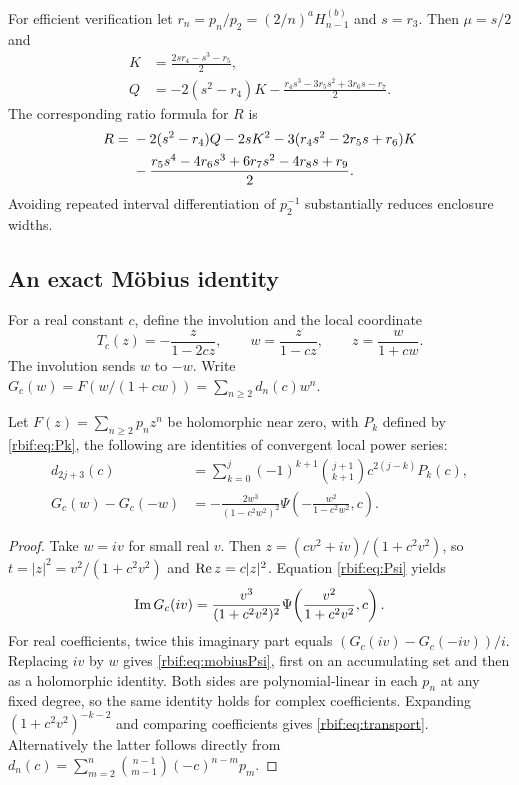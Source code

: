 For efficient verification let $r_n=p_n/p_2=(2/n)^aH_{n-1}^{(b)}$ and
$s=r_3$. Then $\mu=s/2$ and
\begin{align}
 K&=\frac{2sr_4-s^3-r_5}{2},\label{rbif:eq:ratioK}\\
 Q&=-2(s^2-r_4)K
       -\frac{r_4s^3-3r_5s^2+3r_6s-r_7}{2}.\label{rbif:eq:ratioQ}
\end{align}
The corresponding ratio formula for $R$ is
\begin{align}
 R={}&-2(s^2-r_4)Q-2sK^2
       -3(r_4s^2-2r_5s+r_6)K\notag\\
 &-\frac{r_5s^4-4r_6s^3+6r_7s^2-4r_8s+r_9}{2}.
 \label{rbif:eq:ratioR}
\end{align}
Avoiding repeated interval differentiation of $p_2^{-1}$ substantially
reduces enclosure widths.

\subsection{An exact M\"obius identity}
For a real constant $c$, define the involution and the local coordinate
\begin{equation}
 T_c(z)=-\frac{z}{1-2cz},\qquad
 w=\frac{z}{1-cz},\qquad z=\frac{w}{1+cw}.
 \label{rbif:eq:mobius}
\end{equation}
The involution sends $w$ to $-w$. Write
$G_c(w)=F(w/(1+cw))=\sum_{n\ge2}d_n(c)w^n$.

\begin{theorem}
\label{rbif:thm:transport}
Let $F(z)=\sum_{n\ge2}p_nz^n$ be holomorphic near zero, with $P_k$ defined by
\eqref{rbif:eq:Pk}, the following are identities of convergent local
power series:
\begin{align}
 d_{2j+3}(c)
   &=\sum_{k=0}^j(-1)^{k+1}\binom{j+1}{k+1}
                      c^{2(j-k)}P_k(c),\label{rbif:eq:transport}\\
 G_c(w)-G_c(-w)
   &=-\frac{2w^3}{(1-c^2w^2)^2}
      \Psi\!\left(-\frac{w^2}{1-c^2w^2},c\right).
 \label{rbif:eq:mobiusPsi}
\end{align}
\end{theorem}
\begin{proof}
Take $w=iv$ for small real $v$. Then
$z=(cv^2+iv)/(1+c^2v^2)$, so
$t=|z|^2=v^2/(1+c^2v^2)$ and $\operatorname{Re} z=c|z|^2$.
Equation \eqref{rbif:eq:Psi} yields
\[
 \operatorname{Im} G_c(iv)=\frac{v^3}{(1+c^2v^2)^2}
        \Psi\!\left(\frac{v^2}{1+c^2v^2},c\right).
\]
For real coefficients, twice this imaginary part equals
$(G_c(iv)-G_c(-iv))/i$. Replacing $iv$ by $w$ gives
\eqref{rbif:eq:mobiusPsi}, first on an accumulating set and then as a
holomorphic identity. Both sides are polynomial-linear in each $p_n$
at any fixed degree, so the same identity holds for complex coefficients.
Expanding $(1+c^2v^2)^{-k-2}$ and comparing coefficients gives
\eqref{rbif:eq:transport}. Alternatively the latter follows directly
from
$d_n(c)=\sum_{m=2}^n\binom{n-1}{m-1}(-c)^{n-m}p_m$.
\end{proof}

